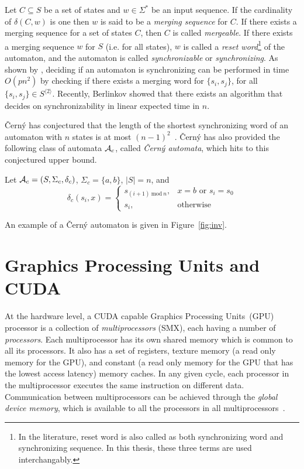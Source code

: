 Let $C \subseteq S$ be a set of states and $w \in \Sigma^*$ be an input sequence.  If the cardinality of $\delta(C,w)$ is one then $w$ is said to be a \textit{merging sequence} for $C$. If there exists a merging sequence for a set of states $C$, then $C$ is called \textit{mergeable}. If there exists a merging sequence $w$ for $S$ (i.e. for all states), $w$ is called a \textit{reset word}\footnote{In the literature, reset word is also called as both synchronizing word and synchronizing sequence. In this thesis, these three terms are used interchangably.} of the automaton, and the automaton is called {\em synchronizable} or {\em synchronizing}. As shown by \cite{Eppstein90}, deciding if an automaton is synchronizing can be performed in time $O(pn^2)$ by checking if there exists a merging word for $\{ s_i, s_j \}$, for all  $\{ s_i, s_j \} \in S^{\langle 2 \rangle}$. Recently, Berlinkov \cite{Berlinkov2016} showed that there exists an algorithm that decides on synchronizability in linear expected time in $n$. 

\v{C}ern\'y has conjectured that the length of the shortest synchronizing word of an automaton with $n$ states is at most $(n-1)^2$~\cite{cerny}. \v{C}ern\'y has also provided the following class of automata ${\cal A}_c$, called {\em \v{C}ern\'y automata}, which hits to this conjectured upper bound. 


Let ${\cal A}_c=(S, \Sigma_c, \delta_c)$, $\Sigma_c = \{a, b\}$, $|S| = n$, and 
\[
  \delta_c(s_i, x) = \left.
  \begin{cases}
    s_{(i+1)\ \mathrm{mod}\ n}, & x = b \text{ or } s_i = s_0\\
    s_i, & \text{otherwise}
  \end{cases} \right.
\]

An example of a \v{C}ern\'y automaton is given in Figure~\ref{fig:inv}.

\section{Graphics Processing Units and CUDA}\label{sec:gpu}

At the hardware level, a CUDA capable Graphics Processing Units~(GPU) processor is a collection of
\textit{multiprocessors} (SMX), each having a number of
\textit{processors}.  Each multiprocessor has its own shared memory
which is common to all its processors.  It also has a set of
registers, texture memory (a read only memory for the GPU), and
constant (a read only memory for the GPU that has the lowest access
latency) memory caches.  In any given cycle, each processor in the
multiprocessor executes the same instruction on different data.
Communication between multiprocessors can be achieved through the
\textit{global device memory}, which is available to all the
processors in all multiprocessors~\cite{nvidia}.

